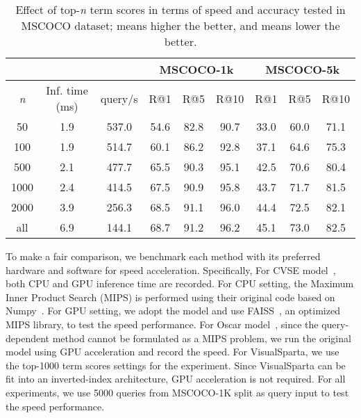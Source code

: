 \begin{table*}[ht!]
\centering
\small
\begin{tabular}{ccc@{\hskip 0.6cm}ccc@{\hskip 0.6cm}ccc}\hline
 & & & \multicolumn{3}{c}{MSCOCO-1k}&  \multicolumn{3}{c}{MSCOCO-5k} \\ \hline 

 \textit{n} & Inf. time (ms) & query/s & R@1 & R@5 & R@10 & R@1 & R@5 & R@10 \\ \hline  

50 & 1.9 & 537.0 & 54.6	& 82.8	& 90.7	& 33.0	& 60.0	& 71.1\\
100	& 1.9 & 514.7	& 60.1	& 86.2	& 92.8	& 37.1	& 64.6	& 75.3\\
500	& 2.1 & 477.7 & 65.5	& 90.3	& 95.1	& 42.5	& 70.6	& 80.4\\
1000 & 2.4 & 414.5 & 67.5	& 90.9	& 95.8	& 43.7	& 71.7	& 81.5\\
2000 & 3.9 & 256.3 & 68.5	& 91.1	& 96.0	& 44.4	& 72.5	& 82.1\\
all & 6.9 & 144.1 & 68.7	& 91.2	& 96.2	& 45.1	& 73.0	& 82.5\\ \hline

\end{tabular}
\caption{Effect of top-\textit{n} term scores in terms of speed and accuracy tested in MSCOCO dataset;  means higher the better, and  means lower the better.}
\label{tbl:visualsparta-tscore}
\end{table*}



To make a fair comparison, we benchmark each method with its preferred hardware and software for speed acceleration. Specifically, For CVSE model~\cite{wang2020consensus}, both CPU and GPU inference time are recorded. For CPU setting, the Maximum Inner Product Search (MIPS) is performed using their original code based on Numpy~\cite{harris2020array}. For GPU setting, we adopt the model and use FAISS~\cite{johnson2019billion}, an optimized MIPS library, to test the speed performance. For Oscar model~\cite{li2020oscar}, since the query-dependent method cannot be formulated as a MIPS problem, we run the original model using GPU acceleration and record the speed. For VisualSparta, we use the top-1000 term scores settings for the experiment. Since VisualSparta can be fit into an inverted-index architecture, GPU acceleration is not required. For all experiments, we use 5000 queries from MSCOCO-1K split as query input to test the speed performance.







